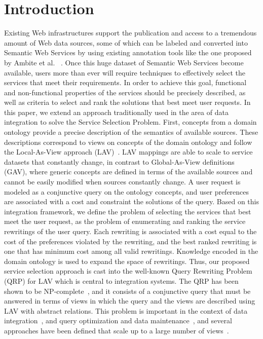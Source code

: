 \documentclass{llncs}
\begin{document}
\section{Introduction}
Existing Web infrastructures support the publication and access to a
tremendous amount of Web data sources, some of which can be labeled
and converted into  Semantic Web Services by using existing annotation
tools like the one proposed  by Ambite et al. \
\cite{AmbiteISWC09}. Once this huge dataset of Semantic Web  Services
become available, users more than ever will require techniques to
effectively select the services that meet their requirements. In order
to achieve  this goal, functional and non-functional properties of the
services should be  precisely described, as well as criteria to select
and rank the solutions that best meet user requests.   In this paper,
we extend an approach traditionally used in the area of data
integration to solve the Service Selection Problem. First, concepts
from a domain ontology provide a precise description of the semantics
of available sources. These  descriptions correspond to views on
concepts of the domain ontology and follow  the Local-As-View approach
(LAV)~\cite{levy:bucket}. LAV mappings are able to  scale to service
datasets that constantly change, in contrast to Global-As-View
definitions  (GAV), where generic concepts are defined in terms of the
available sources and  cannot be easily modified when sources
constantly change. A user request is  modeled as a conjunctive query
on the ontology concepts, and user preferences  are associated with a
cost and constraint the solutions of the query.  Based on this
integration framework, we define the problem of selecting the
services that best meet the user request, as the problem of
enumerating and  ranking the service rewritings of the user
query. Each rewriting is associated  with a cost equal to the cost of
the preferences violated by the rewriting, and the best ranked
rewriting is one that has minimum cost among all valid
rewritings. Knowledge encoded in the domain ontology is used to expand
the  space of rewritings. Thus, our proposed service selection
approach is cast into  the well-known Query Rewriting Problem (QRP)
for LAV which is central to  integration systems.  The QRP  has been shown to
be NP-complete~\cite{Ullman00}, and it  consists of a conjunctive
query that must be answered in terms of views in  which the query and
the views are described using LAV with abstract relations.  This
problem is important in the context of data
integration~\cite{Chen05,JaudoinPRST05},  and query optimization and
data maintenance~\cite{AfratiLU07,levy:bucket}, and  several
approaches have been defined that scale up to a large number of
views~\cite{arvelo:aaai06,pods:DuschkaG97,sac:DuschkaG97,levy:bucket,pottinger:minicon}.
 
\end{document}
